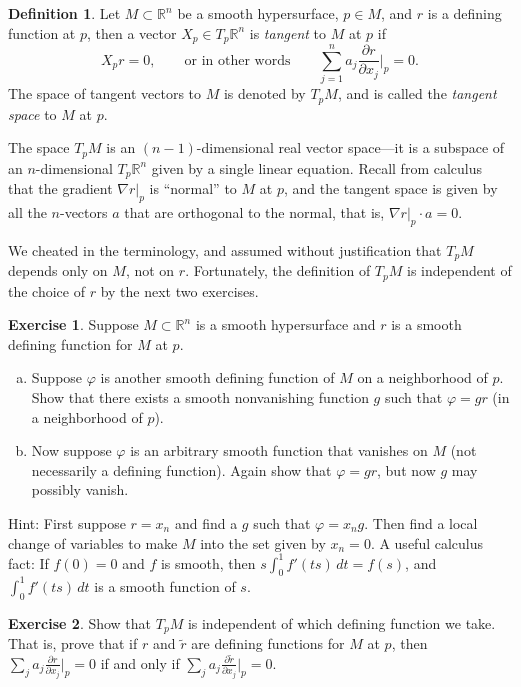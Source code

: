 \documentclass[12pt,openany]{book}
\newcommand{\R}{{\mathbb{R}}}
\newcommand{\myindex}[1]{#1\index{#1}}
\theoremstyle{plain}
\theoremstyle{remark}
\theoremstyle{definition}
\newtheorem{defn}[thm]{Definition}
\newenvironment{exbox}{%
    \def\FrameCommand{\vrule width 1pt \relax\hspace{10pt}}%
    \MakeFramed{\advance\hsize-\width\FrameRestore}%
}{%
    \endMakeFramed
}
\newenvironment{exparts}{%
    \leavevmode\begin{enumerate}[a),noitemsep,topsep=0pt,parsep=0pt,partopsep=0pt]
}{%
    \end{enumerate}
}
\theoremstyle{exercise}
\newtheorem{exercise}{Exercise}[section]
\theoremstyle{example}
\begin{document}
\begin{defn}
Let $M \subset \R^n$ be a smooth hypersurface,
$p \in M$, and $r$ is a defining function at $p$,
then a vector $X_p \in T_p \R^n$ is \emph{tangent}
to $M$ at $p$ if
\begin{equation*}
X_p r = 0, \qquad \text{or in other words} \qquad
\sum_{j=1}^n a_j \frac{\partial r}{\partial x_j} \Big|_p = 0 .
\end{equation*}
%
The space of tangent vectors to $M$ is denoted by $T_p M$, and
is called the \emph{\myindex{tangent space}} to $M$ at $p$.
\end{defn}

The space $T_pM$ is an $(n-1)$-dimensional real vector space---it is a subspace
of an $n$-dimensional $T_p\R^n$ given by a single linear equation.  
Recall from calculus that the gradient $\nabla r|_p$ is
``normal'' to $M$ at $p$, and
the tangent space is given by all the $n$-vectors $a$
that are orthogonal to the normal, that is, $\nabla r|_p \cdot a = 0$.

\pagebreak[1]
We cheated in the terminology, and assumed without justification that $T_pM$
depends only on $M$, not on $r$.
Fortunately, the definition of $T_pM$ is independent of the choice of $r$ by the next two
exercises.

\begin{exbox}
\begin{exercise} \label{exercise:smoothdivision}
Suppose $M \subset \R^n$ is a smooth hypersurface and
$r$ is a smooth defining function for $M$ at $p$.
\begin{exparts}
\item
Suppose $\varphi$ is another
smooth defining function of $M$ on a neighborhood of $p$.
Show that there exists a smooth nonvanishing function $g$ such that
$\varphi = g r$ (in a neighborhood of $p$).
\item
Now suppose $\varphi$ is an arbitrary smooth function that vanishes on $M$ (not
necessarily a defining function).
Again show that $\varphi = g r$, but now $g$ may possibly vanish.
\end{exparts}
\nopagebreak
Hint: First suppose $r=x_n$ and
find a $g$ such that $\varphi = x_n g$.  Then find
a local change of variables to make $M$ into the set given by $x_n = 0$.
A useful calculus fact:
If $f(0) = 0$ and $f$ is smooth, then
$s \int_0^1 f'(ts) \,dt = f(s)$,
and $\int_0^1 f'(ts) \,dt$ is a smooth function of $s$.
\end{exercise}

\begin{exercise}
Show that $T_pM$ is independent of which defining function we take.  That
is,
prove that if $r$ and $\tilde{r}$ are defining functions for $M$ at $p$, then
$\sum_j a_j \frac{\partial r}{\partial x_j} \big|_p = 0$
if and only if
$\sum_j a_j \frac{\partial \tilde{r}}{\partial x_j} \big|_p = 0$.
\end{exercise}
\end{exbox}
\end{document}
